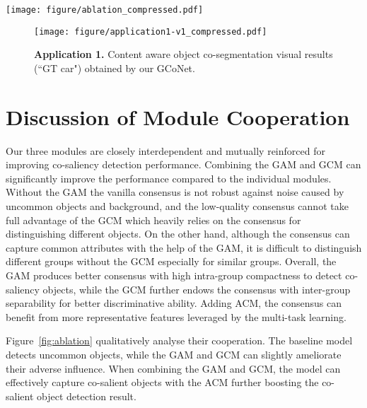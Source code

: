 \documentclass[final]{cvpr}
\def\ourmodel{GCoNet}
\begin{document}
\begin{figure*}
\begin{center}
\texttt{[image: figure/ablation\_compressed.pdf]}
\end{center}
\vspace{-15pt}
   \caption{\textbf{Qualitative ablation studies} of our \ourmodel~on different modules and their combinations. }
\label{fig:ablation}
\vspace{-0.2cm}
\end{figure*}

\begin{figure}
\begin{center}
\texttt{[image: figure/application1-v1\_compressed.pdf]}
\end{center}
\vspace{-10pt}
\caption{\textbf{Application 1.} Content aware object co-segmentation visual results (``GT car") obtained by our \ourmodel.}
\label{fig:app1}
\vspace{-10pt}
\end{figure}


\section{Discussion of Module Cooperation}
Our three modules are closely interdependent and mutually reinforced for improving co-saliency detection performance. Combining the GAM and GCM can significantly improve the performance compared to the individual modules. 
Without the GAM the vanilla consensus is not robust against 
noise caused by  uncommon objects and background, and the low-quality consensus cannot take full advantage of the GCM which heavily relies on the consensus for distinguishing different objects. On the other hand, although the consensus can capture  common attributes with the help of the GAM, it is difficult to distinguish different groups without the GCM especially for similar groups. Overall, the GAM produces better consensus with high intra-group compactness to detect co-saliency objects, while the GCM further endows the consensus with inter-group separability for better discriminative ability. Adding ACM, the consensus can benefit from more representative features leveraged by the multi-task learning.

Figure~\ref{fig:ablation} qualitatively analyse their cooperation. The baseline model detects uncommon objects, while the GAM and GCM can slightly ameliorate their adverse influence. When combining the GAM and GCM, the model can effectively capture co-salient objects with the ACM further boosting the co-salient object detection result.
\end{document}
